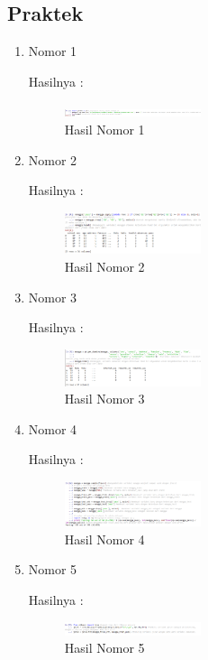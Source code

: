 \subsection{Praktek}
\begin{enumerate}
\item Nomor 1
\hfill\break
	
Hasilnya :
\begin{figure}[H]
		\includegraphics[width=4cm]{figures/1174073/2/1.png}
		\centering
		\caption{Hasil Nomor 1}
\end{figure}

\item Nomor 2
\hfill\break
	
Hasilnya :
\begin{figure}[H]
		\includegraphics[width=4cm]{figures/1174073/2/2.png}
		\centering
		\caption{Hasil Nomor 2}
\end{figure}

\item Nomor 3
\hfill\break
	
Hasilnya :
\begin{figure}[H]
		\includegraphics[width=4cm]{figures/1174073/2/3.png}
		\centering
		\caption{Hasil Nomor 3}
\end{figure}

\item Nomor 4
\hfill\break
	
Hasilnya :
\begin{figure}[H]
		\includegraphics[width=4cm]{figures/1174073/2/4.png}
		\centering
		\caption{Hasil Nomor 4}
\end{figure}

\item Nomor 5
\hfill\break
	
Hasilnya :
\begin{figure}[H]
		\includegraphics[width=4cm]{figures/1174073/2/5.png}
		\centering
		\caption{Hasil Nomor 5}
\end{figure}


\end{enumerate}
